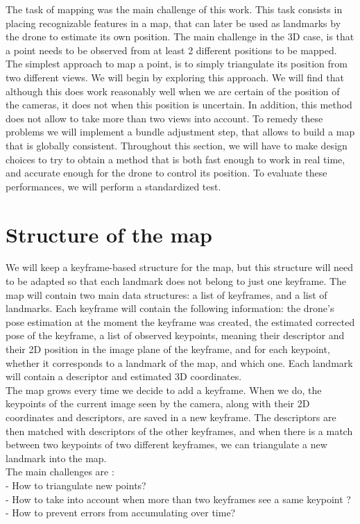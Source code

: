 
The task of mapping was the main challenge of this work. This task consists in placing recognizable features in a map, that can later be used as landmarks by the drone to estimate its own position. The main challenge in the 3D case, is that a point needs to be observed from at least 2 different positions to be mapped. The simplest approach to map a point, is to simply triangulate its position from two different views. We will begin by exploring this approach. We will find that although this does work reasonably well when we are certain of the position of the cameras, it does not when this position is uncertain. In addition, this method does not allow to take more than two views into account. To remedy these problems we will implement a bundle adjustment step, that allows to build a map that is globally consistent. Throughout this section, we will have to make design choices to try to obtain a method that is both fast enough to work in real time, and accurate enough for the drone to control its position. To evaluate these performances, we will perform a standardized test.

\section{Structure of the map}
We will keep a keyframe-based structure for the map, but this structure will need to be adapted so that each landmark does not belong to just one keyframe. The map will contain two main data structures: a list of keyframes, and a list of landmarks. Each keyframe will contain the following information: the drone's pose estimation at the moment the keyframe was created, the estimated corrected pose of the keyframe, a list of observed keypoints, meaning their descriptor and their 2D position in the image plane of the keyframe, and for each keypoint, whether it corresponds to a landmark of the map, and which one. Each landmark will contain a descriptor and estimated 3D coordinates.\\
The map grows every time we decide to add a keyframe. When we do, the keypoints of the current image seen by the camera, along with their 2D coordinates and descriptors, are saved in a new keyframe. The descriptors are then matched with descriptors of the other keyframes, and when there is a match between two keypoints of two different keyframes, we can triangulate a new landmark into the map.\\
The main challenges are :\\
- How to triangulate new points?\\
- How to take into account when more than two keyframes see a same keypoint ?\\
- How to prevent errors from accumulating over time?\\


